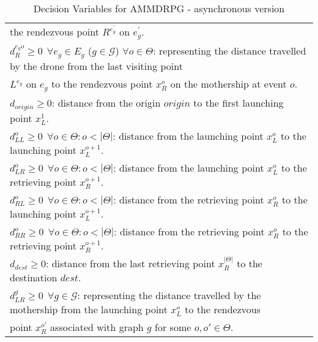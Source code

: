 \begin{table}[h]
\begin{tabular}{|l|}
\hspace*{1cm}  the rendezvous point $R^{e^\prime_g}$ on $e^\prime_g$.\\
$d_R^{e_g o} \geq 0 \:\: \forall e_g \in E_g$ ($g \in \mathcal{G}$) $\forall o \in \Theta$: representing the distance travelled by the drone from the last visiting point\\
\hspace*{1cm} $L^{e_g}$ on $e_g$ to the rendezvous point $x_R^o$ on the mothership at event $o$.\\
$d_{origin}\geq 0$: distance from the origin $origin$ to the first launching point $x_L^1$.\\
$d_{LL}^o\geq 0 \:\: \forall o \in \Theta:o<|\Theta|$: distance from the launching point $x_L^o$ to the launching point $x_L^{o+1}$.\\
$d_{LR}^o\geq 0 \:\: \forall o \in \Theta:o<|\Theta|$: distance from the launching point $x_L^o$ to the retrieving point $x_R^{o+1}$.\\
$d_{RL}^o\geq 0 \:\: \forall o \in \Theta:o<|\Theta|$: distance from the retrieving point $x_R^o$ to the launching point $x_L^{o+1}$.\\
$d_{RR}^o\geq 0 \:\: \forall o \in \Theta:o<|\Theta|$: distance from the retrieving point $x_R^o$ to the retrieving point $x_R^{o+1}$.\\
$d_{dest}\geq 0$: distance from the last retrieving point $x_R^{|\Theta|}$ to the destination $dest$.\\
$d_{LR}^g\geq 0 \:\: \forall g \in\mathcal G$: representing the distance travelled by the mothership from the launching point $x_L^o$ to the rendezvous\\
\hspace*{1cm} point $x_R^{o'}$ associated with graph $g$ for some $o, o' \in \Theta$.
\hline
\end{tabular}
\caption{Decision Variables for AMMDRPG - asynchronous version }
\label{table:t3}
\end{table}

\clearpage



